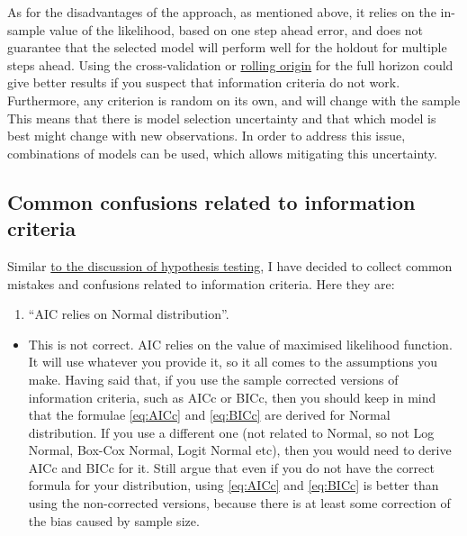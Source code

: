 \documentclass[
]{book}
\providecommand{\tightlist}{%
  \setlength{\itemsep}{0pt}\setlength{\parskip}{0pt}}
\theoremstyle{definition}
\theoremstyle{definition}
\theoremstyle{definition}
\theoremstyle{definition}
\theoremstyle{remark}
\begin{document}
As for the disadvantages of the approach, as mentioned above, it relies on the in-sample value of the likelihood, based on one step ahead error, and does not guarantee that the selected model will perform well for the holdout for multiple steps ahead. Using the cross-validation or \protect\hyperlink{rollingOrigin}{rolling origin} for the full horizon could give better results if you suspect that information criteria do not work. Furthermore, any criterion is random on its own, and will change with the sample This means that there is model selection uncertainty and that which model is best might change with new observations. In order to address this issue, combinations of models can be used, which allows mitigating this uncertainty.

\hypertarget{informationCriteriaMistakes}{%
\subsection{Common confusions related to information criteria}\label{informationCriteriaMistakes}}

Similar \protect\hyperlink{hypothesisTestingMistakes}{to the discussion of hypothesis testing}, I have decided to collect common mistakes and confusions related to information criteria. Here they are:

\begin{enumerate}
\def\labelenumi{\arabic{enumi}.}
\tightlist
\item
  ``AIC relies on Normal distribution''.
\end{enumerate}

\begin{itemize}
\tightlist
\item
  This is not correct. AIC relies on the value of maximised likelihood function. It will use whatever you provide it, so it all comes to the assumptions you make. Having said that, if you use the sample corrected versions of information criteria, such as AICc or BICc, then you should keep in mind that the formulae \eqref{eq:AICc} and \eqref{eq:BICc} are derived for Normal distribution. If you use a different one (not related to Normal, so not Log Normal, Box-Cox Normal, Logit Normal etc), then you would need to derive AICc and BICc for it. Still \citet{Burnham2004} argue that even if you do not have the correct formula for your distribution, using \eqref{eq:AICc} and \eqref{eq:BICc} is better than using the non-corrected versions, because there is at least some correction of the bias caused by sample size.
\end{itemize}
\end{document}
